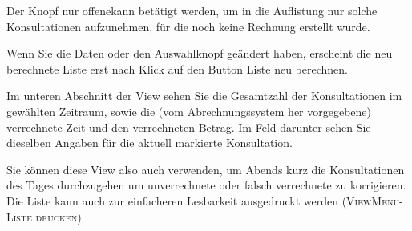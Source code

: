 Der Knopf \glqq nur offene\grqq kann betätigt werden, um in die Auflistung nur
solche Konsultationen aufzunehmen, für die noch keine Rechnung erstellt wurde.

Wenn Sie die Daten oder den Auswahlknopf geändert haben, erscheint die neu
berechnete Liste erst nach Klick auf den Button \glqq Liste neu berechnen\grqq.

Im unteren Abschnitt der View sehen Sie die Gesamtzahl der Konsultationen im
gewählten Zeitraum, sowie die (vom Abrechnungssystem her vorgegebene)
verrechnete Zeit und den verrechneten Betrag. Im Feld darunter sehen Sie
dieselben Angaben für die aktuell markierte Konsultation.

Sie können diese View also auch verwenden, um Abends kurz die Konsultationen des Tages
durchzugehen um unverrechnete oder falsch verrechnete zu korrigieren. Die Liste
kann auch zur einfacheren Lesbarkeit ausgedruckt werden (\textsc{ViewMenu-Liste drucken})
